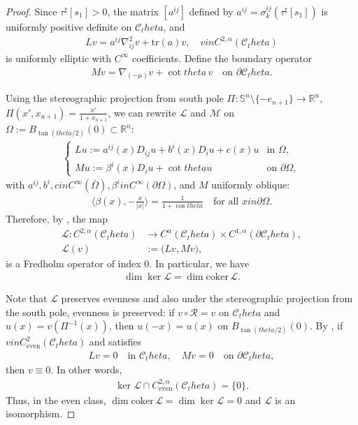 \documentclass[12pt]{amsart}
\def\theta{theta}%
\def\in{in }%
\numberwithin{equation}{section}
\newcommand{\ov}{\overline}
\newcommand{\bbR}{\mathbb{R}}
\newcommand{\Sn}{\mathbb{S}^n}
\newcommand{\8}{\infty}
\newcommand{\al}{\alpha}
\newcommand{\cC}{\mathcal{C}}
\newcommand{\cL}{\mathcal{L}}
\newcommand{\cM}{\mathcal{M}}
\newcommand{\cR}{\mathcal{R}}
\newcommand{\eq}[1]{\begin{equation}\begin{alignedat}{2}#1\end{alignedat}\end{equation}}
\newcommand{\Cth}{\cC_\theta}
\begin{document}
\begin{proof}
Since $\tau^\sharp[s_1]>0$, the matrix $[a^{ij}]$ defined by
$a^{ij}=\sigma_k^{ij}(\tau^\sharp[s_1])$ is uniformly
positive definite on $\Cth$, and
\eq{
 Lv=a^{ij}\nabla^2_{ij}v+\mathrm{tr}(a)v,\quad v\in C^{2,\al}(\Cth)
}
is uniformly elliptic with $C^{\infty}$ coefficients. Define the boundary operator
\eq{
Mv=\nabla_{(-\mu)} v+\cot\theta\, v
  \quad\text{on }\partial\Cth.
}

Using the stereographic projection from south pole $\Pi:\Sn\setminus\{-e_{n+1}\}\to\bbR^n$, $\Pi(x',x_{n+1})=\frac{x'}{1+x_{n+1}}$, we can rewrite $\cL$ and $\cM$ on $\Omega:= B_{\tan(\theta/2)}(0)\subset\bbR^n$:
\eq{
  \begin{cases}
    L u
    := a^{ij}(x)D_{ij}u
       + b^i(x)D_i u
       + c(x)u
    & \text{in }\Omega,\\
    M u
    := \beta^i(x)D_i u
       + \cot\theta u
    & \text{on }\partial\Omega,
  \end{cases}
}
with $a^{ij},b^i,c\in C^{\infty}(\ov\Omega), \beta^i\in C^{\infty}(\partial\Omega)$, and
$M$ uniformly oblique:
\eq{
 \langle \beta(x),-\frac{x}{|x|}\rangle=\frac{1}{1+\cos\theta}
  \quad\text{for all }x\in\partial\Omega.
}
Therefore, by \cite[Thm. 2.30]{Lie13}, the map
\eq{
  \cL:C^{2,\alpha}(\Cth)
    &\to C^{\alpha}(\Cth)\times C^{1,\alpha}(\partial\Cth),\\
\cL(v)&:=\bigl(L v,Mv\bigr),
}
is a Fredholm operator of index 0. In particular, we have
\eq{
  \dim\ker\cL=\dim\mathrm{coker}\,\cL.
}

Note that $\cL$ preserves evenness and also under the stereographic projection from the south pole, evenness is preserved: 
if $v\circ\cR=v$ on $\Cth$ and $u(x)=v(\Pi^{-1}(x))$, then $u(-x)=u(x)$ on $B_{\tan(\theta/2)}(0)$.
By \cite[Lem. 5.4]{HIS25}, if $v\in C_{\text{even}}^2(\Cth)$ and satisfies
\eq{
L v=0 \quad\text{in }\Cth,\quad
  Mv=0 \quad\text{on }\partial\Cth,
}
then $v\equiv 0$. In other words,
\eq{
  \ker\cL\cap C^{2,\alpha}_{\mathrm{even}}(\Cth)=\{0\}.
}
Thus, in the even class,
$\dim\mathrm{coker}\,\cL=\dim\ker\cL= 0$
and $\cL$ is an isomorphism. 
\end{proof}
\end{document}
